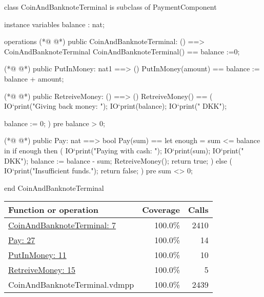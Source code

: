 \begin{vdmpp}
class CoinAndBanknoteTerminal is subclass of PaymentComponent

instance variables
 balance : nat;

operations
(*@
\label{CoinAndBanknoteTerminal:7}
@*)
 public CoinAndBanknoteTerminal: () ==> CoinAndBanknoteTerminal
  CoinAndBanknoteTerminal() ==
   balance :=0;

(*@
\label{PutInMoney:11}
@*)
 public PutInMoney: nat1 ==> ()
  PutInMoney(amount) ==
   balance := balance + amount;

(*@
\label{RetreiveMoney:15}
@*)
 public RetreiveMoney: () ==> ()
  RetreiveMoney() ==
  (
   IO`print("Giving back money: ");
   IO`print(balance);
   IO`print(" DKK\n");
   
   balance := 0;
  )
  pre balance > 0;
  
  
(*@
\label{Pay:27}
@*)
 public Pay: nat ==> bool
  Pay(sum) ==
   let enough = sum <= balance
      in
    if enough then
    (
     IO`print("Paying with cash: ");
     IO`print(sum);
     IO`print(" DKK\n");
     balance := balance - sum;
     RetreiveMoney();
     return true;
    ) else 
    (  
     IO`print("Insufficient funds.\n");
     return false;
    )
  pre sum <> 0;   

end CoinAndBanknoteTerminal
\end{vdmpp}
\bigskip
\begin{longtable}{|l|r|r|}
\hline
Function or operation & Coverage & Calls \\
\hline
\hline
\hyperref[CoinAndBanknoteTerminal:7]{CoinAndBanknoteTerminal: 7} & 100.0\% & 2410 \\
\hline
\hyperref[Pay:27]{Pay: 27} & 100.0\% & 14 \\
\hline
\hyperref[PutInMoney:11]{PutInMoney: 11} & 100.0\% & 10 \\
\hline
\hyperref[RetreiveMoney:15]{RetreiveMoney: 15} & 100.0\% & 5 \\
\hline
\hline
CoinAndBanknoteTerminal.vdmpp & 100.0\% & 2439 \\
\hline
\end{longtable}

